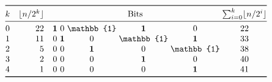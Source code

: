 \documentclass[11pt]{article}
\newcommand\floor[1]{\lfloor{#1}\rfloor}
\begin{document}
\TeXtoEPS
\(
\begin{array}{@{}crc@{\;}c@{\;}c@{\;}c@{\;}c@{\;}c@{}}
\toprule
 k & \floor{n/2^k} & \multicolumn{5}{c}{\text{Bits}}%
   & \sum_{i=0}^k\floor{n/2^i}\\
\midrule
0 & 22 & \boldsymbol{1} &        0 & \mathbb{1} & \boldsymbol{1} & 0 & 22\\
1 & 11 &        0 & \boldsymbol{1} &          0 & \mathbb{1} & \boldsymbol{1} & 33\\
2 &  5 &        0 &        0 &   \boldsymbol{1} & 0 & \mathbb{1} & 38\\
3 &  2 &        0 &        0 &          0 & \boldsymbol{1} & 0 & 40\\
4 &  1 &        0 &        0 &          0 & 0 & \boldsymbol{1} & 41\\
\bottomrule
\end{array}
\)
\endTeXtoEPS
\end{document}
